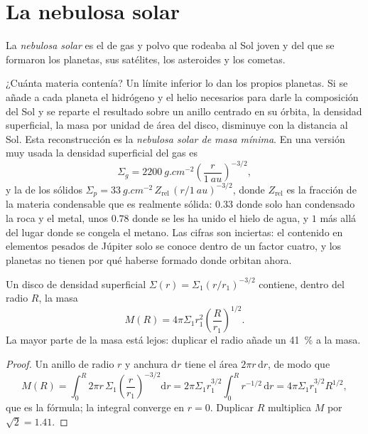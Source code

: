 \section{La nebulosa solar}

\begin{definition}\label{def:b2:planet-formation-meteorites:nebula}
La \emph{nebulosa solar} es el  de gas
y polvo que rodeaba al Sol joven y del que se formaron los planetas, sus
satélites, los asteroides y los cometas.
\end{definition}

¿Cuánta materia contenía? Un límite inferior lo dan los propios planetas.
Si se añade a cada planeta el hidrógeno y el helio necesarios para darle la composición del
Sol y se reparte el resultado sobre un anillo centrado en su órbita, la densidad
superficial, la masa por unidad de área del disco, disminuye con la distancia al
Sol. Esta reconstrucción es la \emph{nebulosa solar de masa
mínima}. En una versión muy usada la densidad
superficial del gas es
\[
  \Sigma_g = \qty{2200}{g.cm^{-2}}\left(\frac{r}{\qty{1}{au}}\right)^{-3/2},
\]
y la de los sólidos $\Sigma_p = \qty{33}{g.cm^{-2}}\,Z_{\mathrm{rel}}\,
(r/\qty{1}{au})^{-3/2}$, donde $Z_{\mathrm{rel}}$ es la fracción de la materia
condensable que es realmente sólida: $0.33$ donde solo han condensado la roca y el metal,
unos $0.78$ donde se les ha unido el hielo de agua, y $1$ más allá del lugar
donde se congela el metano. Las cifras son inciertas: el contenido en elementos pesados de
Júpiter solo se conoce dentro de un factor cuatro, y los planetas no tienen por qué haberse
formado donde orbitan ahora.

\begin{proposition}\label{prop:b2:planet-formation-meteorites:disc-mass}
Un disco de densidad superficial $\Sigma(r) = \Sigma_1 (r/r_1)^{-3/2}$ contiene, dentro
del radio $R$, la masa
\[
  M(R) = 4\pi\Sigma_1 r_1^2 \left(\frac{R}{r_1}\right)^{1/2}.
\]
La mayor parte de la masa está lejos: duplicar el radio añade un \qty{41}{\percent} a
la masa.
\end{proposition}

\begin{proof}
Un anillo de radio $r$ y anchura $\mathrm dr$ tiene el área $2\pi r\,\mathrm dr$, de modo que
\[
  M(R) = \int_0^R 2\pi r\,\Sigma_1 \left(\frac{r}{r_1}\right)^{-3/2}\mathrm dr
       = 2\pi\Sigma_1 r_1^{3/2}\int_0^R r^{-1/2}\,\mathrm dr
       = 4\pi\Sigma_1 r_1^{3/2} R^{1/2},
\]
que es la fórmula; la integral converge en $r = 0$. Duplicar $R$
multiplica $M$ por $\sqrt 2 = 1.41$.
\end{proof}


